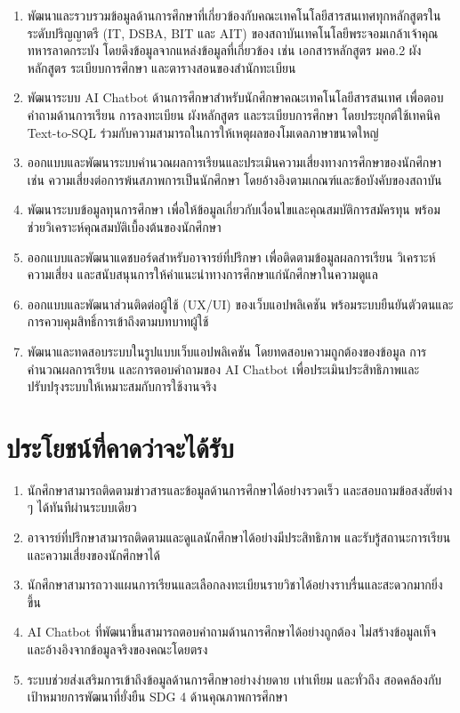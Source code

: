 \begin{enumerate}
    \item พัฒนาและรวบรวมข้อมูลด้านการศึกษาที่เกี่ยวข้องกับคณะเทคโนโลยีสารสนเทศทุกหลักสูตรในระดับปริญญาตรี (IT, DSBA, BIT และ AIT) ของสถาบันเทคโนโลยีพระจอมเกล้าเจ้าคุณทหารลาดกระบัง โดยดึงข้อมูลจากแหล่งข้อมูลที่เกี่ยวข้อง เช่น เอกสารหลักสูตร มคอ.2 ผังหลักสูตร ระเบียบการศึกษา และตารางสอนของสำนักทะเบียน
    \item พัฒนาระบบ AI Chatbot ด้านการศึกษาสำหรับนักศึกษาคณะเทคโนโลยีสารสนเทศ เพื่อตอบคำถามด้านการเรียน การลงทะเบียน ผังหลักสูตร และระเบียบการศึกษา โดยประยุกต์ใช้เทคนิค Text-to-SQL ร่วมกับความสามารถในการให้เหตุผลของโมเดลภาษาขนาดใหญ่
    \item ออกแบบและพัฒนาระบบคำนวณผลการเรียนและประเมินความเสี่ยงทางการศึกษาของนักศึกษา เช่น ความเสี่ยงต่อการพ้นสภาพการเป็นนักศึกษา โดยอ้างอิงตามเกณฑ์และข้อบังคับของสถาบัน
    \item พัฒนาระบบข้อมูลทุนการศึกษา เพื่อให้ข้อมูลเกี่ยวกับเงื่อนไขและคุณสมบัติการสมัครทุน พร้อมช่วยวิเคราะห์คุณสมบัติเบื้องต้นของนักศึกษา
    \item ออกแบบและพัฒนาแดชบอร์ดสำหรับอาจารย์ที่ปรึกษา เพื่อติดตามข้อมูลผลการเรียน วิเคราะห์ความเสี่ยง และสนับสนุนการให้คำแนะนำทางการศึกษาแก่นักศึกษาในความดูแล
    \item ออกแบบและพัฒนาส่วนติดต่อผู้ใช้ (UX/UI) ของเว็บแอปพลิเคชัน พร้อมระบบยืนยันตัวตนและการควบคุมสิทธิ์การเข้าถึงตามบทบาทผู้ใช้
    \item พัฒนาและทดสอบระบบในรูปแบบเว็บแอปพลิเคชัน โดยทดสอบความถูกต้องของข้อมูล การคำนวณผลการเรียน และการตอบคำถามของ AI Chatbot เพื่อประเมินประสิทธิภาพและปรับปรุงระบบให้เหมาะสมกับการใช้งานจริง
\end{enumerate}

\section{ประโยชน์ที่คาดว่าจะได้รับ}

\begin{enumerate}
    \item นักศึกษาสามารถติดตามข่าวสารและข้อมูลด้านการศึกษาได้อย่างรวดเร็ว และสอบถามข้อสงสัยต่าง ๆ ได้ทันทีผ่านระบบเดียว
    \item อาจารย์ที่ปรึกษาสามารถติดตามและดูแลนักศึกษาได้อย่างมีประสิทธิภาพ และรับรู้สถานะการเรียนและความเสี่ยงของนักศึกษาได้
    \item นักศึกษาสามารถวางแผนการเรียนและเลือกลงทะเบียนรายวิชาได้อย่างราบรื่นและสะดวกมากยิ่งขึ้น
    \item AI Chatbot ที่พัฒนาขึ้นสามารถตอบคำถามด้านการศึกษาได้อย่างถูกต้อง ไม่สร้างข้อมูลเท็จ และอ้างอิงจากข้อมูลจริงของคณะโดยตรง
    \item ระบบช่วยส่งเสริมการเข้าถึงข้อมูลด้านการศึกษาอย่างง่ายดาย เท่าเทียม และทั่วถึง สอดคล้องกับเป้าหมายการพัฒนาที่ยั่งยืน SDG 4 ด้านคุณภาพการศึกษา
\end{enumerate}

